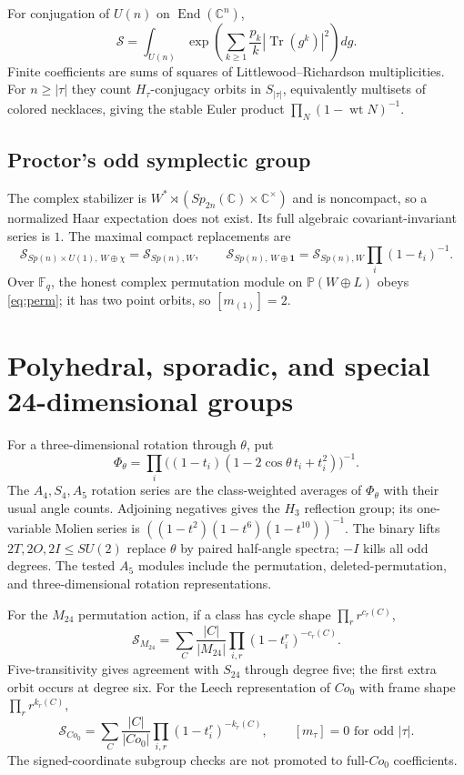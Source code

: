 \documentclass[10pt]{article}
\newcommand{\Tr}{\operatorname{Tr}}
\newcommand{\MGF}{\mathcal S}
\newcommand{\F}{\mathbb F}
\newcommand{\C}{\mathbb C}
\begin{document}
For conjugation of $U(n)$ on $\operatorname{End}(\C^n)$,
\begin{equation}\label{eq:conj}
\boxed{\MGF=\int_{U(n)}\exp\!\left(\sum_{k\ge1}\frac{p_k}{k}
|\Tr(g^k)|^2\right)dg.}
\end{equation}
Finite coefficients are sums of squares of Littlewood--Richardson
multiplicities. For $n\ge|\tau|$ they count $H_\tau$-conjugacy orbits in
$S_{|\tau|}$, equivalently multisets of colored necklaces, giving the stable
Euler product $\prod_N(1-\operatorname{wt}N)^{-1}$.

\subsection{Proctor's odd symplectic group}
The complex stabilizer is
$W^*\rtimes(Sp_{2n}(\C)\times\C^\times)$ and is noncompact, so a normalized
Haar expectation does not exist. Its full algebraic covariant-invariant
series is $1$. The maximal compact replacements are
\[
\MGF_{Sp(n)\times U(1),\,W\oplus\chi}=\MGF_{Sp(n),W},\qquad
\MGF_{Sp(n),\,W\oplus\mathbf1}=\MGF_{Sp(n),W}\prod_i(1-t_i)^{-1}.
\]
Over $\F_q$, the honest complex permutation module on $\mathbb P(W\oplus L)$
obeys \eqref{eq:perm}; it has two point orbits, so $[m_{(1)}]=2$.

\section{Polyhedral, sporadic, and special 24-dimensional groups}

For a three-dimensional rotation through $\theta$, put
\[
\Phi_\theta=\prod_i\big((1-t_i)(1-2\cos\theta\,t_i+t_i^2)\big)^{-1}.
\]
The $A_4,S_4,A_5$ rotation series are the class-weighted averages of
$\Phi_\theta$ with their usual angle counts. Adjoining negatives gives the
$H_3$ reflection group; its one-variable Molien series is
$((1-t^2)(1-t^6)(1-t^{10}))^{-1}$. The binary lifts $2T,2O,2I\le SU(2)$
replace $\theta$ by paired half-angle spectra; $-I$ kills all odd degrees.
The tested $A_5$ modules include the permutation, deleted-permutation, and
three-dimensional rotation representations.

For the $M_{24}$ permutation action, if a class has cycle shape
$\prod_r r^{c_r(C)}$,
\[
\boxed{\MGF_{M_{24}}=\sum_C\frac{|C|}{|M_{24}|}
\prod_{i,r}(1-t_i^r)^{-c_r(C)}.}
\]
Five-transitivity gives agreement with $S_{24}$ through degree five; the first
extra orbit occurs at degree six. For the Leech representation of $Co_0$ with
frame shape $\prod_r r^{k_r(C)}$,
\[
\boxed{\MGF_{Co_0}=\sum_C\frac{|C|}{|Co_0|}
\prod_{i,r}(1-t_i^r)^{-k_r(C)},\qquad [m_\tau]=0\text{ for odd }|\tau|.}
\]
The signed-coordinate subgroup checks are not promoted to full-$Co_0$
coefficients.
\end{document}

